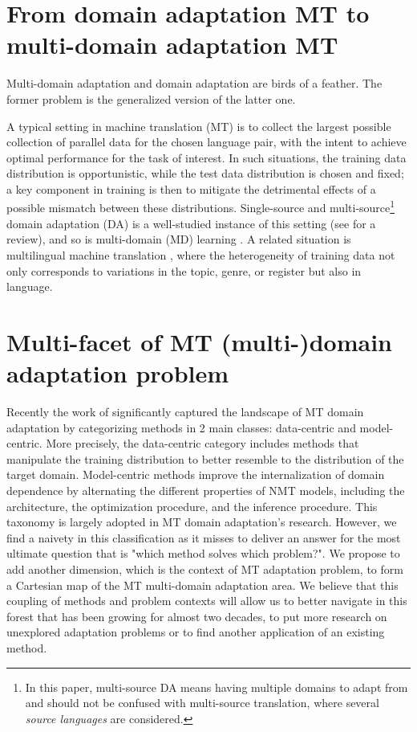 \section{From domain adaptation MT to multi-domain adaptation MT}
Multi-domain adaptation and domain adaptation are birds of a feather. The former problem is the generalized version of the latter one. 

A typical setting in machine translation (MT) is to collect the largest possible collection of parallel data for the chosen language pair, with the intent to achieve optimal performance for the task of interest. In such situations, the training data distribution is opportunistic, while the test data distribution is chosen and fixed; a key component in training is then to mitigate the detrimental effects of a possible mismatch between these distributions. Single-source and multi-source\footnote{In this paper, multi-source DA means having multiple domains to adapt from and should not be confused with multi-source translation, where several \emph{source languages} are considered.} domain adaptation (DA) is a well-studied instance of this setting (see \citet{Chu17comparison,Saunders21asurvey} for a review), and so is multi-domain (MD) learning \citep{Chu18multilingual,Zeng18multidomain,Jiang19multidomain,Pham21revisiting}. A related situation is multilingual machine translation \citep{Firat16multiway,Ha16towards,Johnson17google,Aharoni19massively},
where the heterogeneity of training data not only corresponds to variations in the topic, genre, or register but also in language.

\section{Multi-facet of MT (multi-)domain adaptation problem}
Recently the work of \citet{Chu18survey} significantly captured the landscape of MT domain adaptation by categorizing methods in 2 main classes: data-centric and model-centric. More precisely, the data-centric category includes methods that manipulate the training distribution to better resemble to the distribution of the target domain. Model-centric methods improve the internalization of domain dependence by alternating the different properties of NMT models, including the architecture, the optimization procedure, and the inference procedure. This taxonomy is largely adopted in MT domain adaptation's research. However, we find a naivety in this classification as it misses to deliver an answer for the most ultimate question that is "which method solves which problem?". We propose to add another dimension, which is the context of MT adaptation problem, to form a Cartesian map of the MT multi-domain adaptation area. We believe that this coupling of methods and problem contexts will allow us to better navigate in this forest that has been growing for almost two decades, to put more research on unexplored adaptation problems or to find another application of an existing method.

